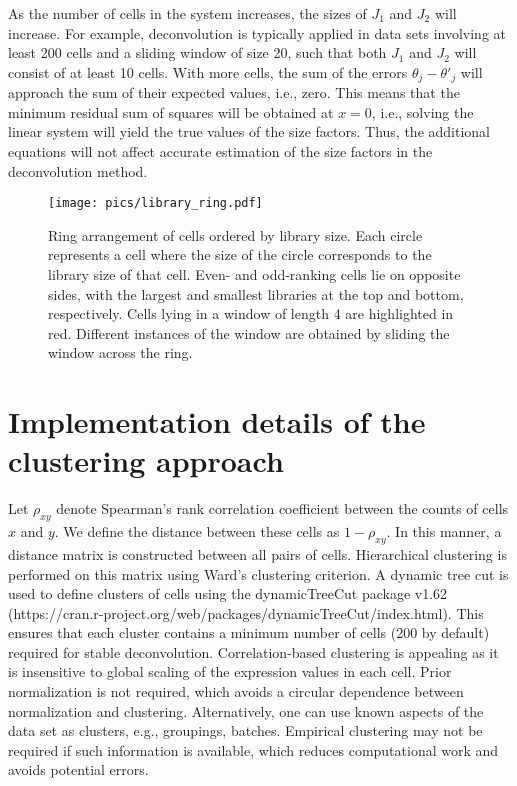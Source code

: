 \documentclass{article}
\begin{document}
As the number of cells in the system increases, the sizes of $J_1$ and $J_2$ will increase. 
For example, deconvolution is typically applied in data sets involving at least 200 cells and a sliding window of size 20, such that both $J_1$ and $J_2$ will consist of at least 10 cells.
With more cells, the sum of the errors $\theta_j - \theta'_j$ will approach the sum of their expected values, i.e., zero.
This means that the minimum residual sum of squares will be obtained at $x=0$, i.e., solving the linear system will yield the true values of the size factors.
Thus, the additional equations will not affect accurate estimation of the size factors in the deconvolution method.



\begin{figure}[bt]
    \begin{center}
        \texttt{[image: pics/library\_ring.pdf]}
    \end{center}
    \caption{
        Ring arrangement of cells ordered by library size.
        Each circle represents a cell where the size of the circle corresponds to the library size of that cell.
        Even- and odd-ranking cells lie on opposite sides, with the largest and smallest libraries at the top and bottom, respectively.
        Cells lying in a window of length 4 are highlighted in red.
        Different instances of the window are obtained by sliding the window across the ring.
    }
    \label{fig:library_ring}
\end{figure}

\section{Implementation details of the clustering approach}
Let $\rho_{xy}$ denote Spearman's rank correlation coefficient between the counts of cells $x$ and $y$.
We define the distance between these cells as $1-\rho_{xy}$.
In this manner, a distance matrix is constructed between all pairs of cells.
Hierarchical clustering is performed on this matrix using Ward's clustering criterion.
A dynamic tree cut is used to define clusters of cells using the dynamicTreeCut package v1.62 ({https://cran.r-project.org/web/packages/dynamicTreeCut/index.html}).
This ensures that each cluster contains a minimum number of cells (200 by default) required for stable deconvolution.
Correlation-based clustering is appealing as it is insensitive to global scaling of the expression values in each cell.
Prior normalization is not required, which avoids a circular dependence between normalization and clustering.
Alternatively, one can use known aspects of the data set as clusters, e.g., groupings, batches.
Empirical clustering may not be required if such information is available, which reduces computational work and avoids potential errors.
\end{document}
